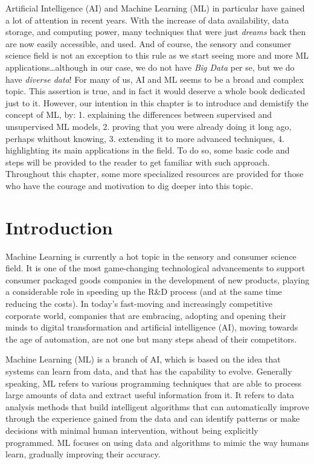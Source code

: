 \documentclass[
]{krantz}
\renewenvironment{quote}{\begin{VF}}{\end{VF}}
\begin{document}
\begin{quote}
Artificial Intelligence (AI) and Machine Learning (ML) in particular have gained a lot of attention in recent years. With the increase of data availability, data storage, and computing power, many techniques that were just \emph{dreams} back then are now easily accessible, and used. And of course, the sensory and consumer science field is not an exception to this rule as we start seeing more and more ML applications\ldots although in our case, we do not have \emph{Big Data} per se, but we do have \emph{diverse data}!
For many of us, AI and ML seems to be a broad and complex topic. This assertion is true, and in fact it would deserve a whole book dedicated just to it. However, our intention in this chapter is to introduce and demistify the concept of ML, by:
1. explaining the differences between supervised and unsupervised ML models,
2. proving that you were already doing it long ago, perhaps whithout knowing,
3. extending it to more advanced techniques,
4. highlighting its main applications in the field.
To do so, some basic code and steps will be provided to the reader to get familiar with such approach. Throughout this chapter, some more specialized resources are provided for those who have the courage and motivation to dig deeper into this topic.
\end{quote}

\hypertarget{introduction-2}{%
\section{Introduction}\label{introduction-2}}

Machine Learning is currently a hot topic in the sensory and consumer science field. It is one of the most game-changing technological advancements to support consumer packaged goods companies in the development of new products, playing a considerable role in speeding up the R\&D process (and at the same time reducing the costs). In today's fast-moving and increasingly competitive corporate world, companies that are embracing, adopting and opening their minds to digital transformation and artificial intelligence (AI), moving towards the age of automation, are not one but many steps ahead of their competitors.

Machine Learning (ML) is a branch of AI, which is based on the idea that systems can learn from data, and that has the capability to evolve. Generally speaking, ML refers to various programming techniques that are able to process large amounts of data and extract useful information from it. It refers to data analysis methods that build intelligent algorithms that can automatically improve through the experience gained from the data and can identify patterns or make decisions with minimal human intervention, without being explicitly programmed. ML focuses on using data and algorithms to mimic the way humans learn, gradually improving their accuracy.
\end{document}
